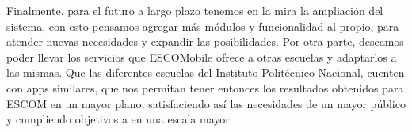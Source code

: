 \newline
\newline
Finalmente, para el futuro a largo plazo tenemos en la mira la ampliación del sistema, con esto pensamos agregar más módulos y funcionalidad al propio, para atender nuevas necesidades y expandir las posibilidades. 
\newline
Por otra parte, deseamos poder llevar los servicios que ESCOMobile ofrece a otras escuelas y adaptarlos a las mismas. Que las diferentes escuelas del Instituto Politécnico Nacional, cuenten con apps similares, que nos permitan tener entonces los resultados obtenidos para ESCOM en un mayor plano, satisfaciendo así las necesidades de un mayor público y cumpliendo objetivos a en una escala mayor. 